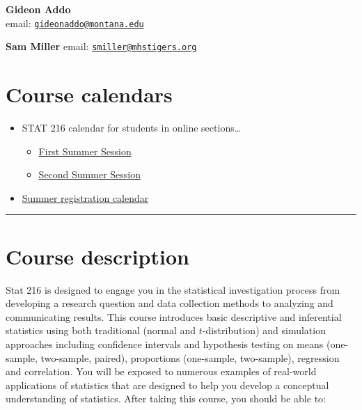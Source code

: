 \documentclass[
]{article}
\providecommand{\tightlist}{%
  \setlength{\itemsep}{0pt}\setlength{\parskip}{0pt}}
\begin{document}
\textbf{Gideon Addo}\\
email:
\href{mailto:gideonaddo@montana.edu}{\nolinkurl{gideonaddo@montana.edu}}

\textbf{Sam Miller} email:
\href{mailto:smiller@mhstigers.org}{\nolinkurl{smiller@mhstigers.org}}

\section{Course calendars}\label{course-calendars}

\begin{itemize}
\tightlist
\item
  STAT 216 calendar for students in online sections\ldots{}

  \begin{itemize}
  \tightlist
  \item
    \href{calendars/Sum1_25-Stat216_Calendar-Online.pdf}{First Summer
    Session}
  \item
    \href{calendars/Sum2_25-Stat216_Calendar-Online.pdf}{Second Summer
    Session}
  \end{itemize}
\item
  \href{https://www.montana.edu/registrar/add_drop_schedule.html}{Summer
  registration calendar}
\end{itemize}

\begin{center}\rule{0.5\linewidth}{0.5pt}\end{center}

\section{Course description}\label{course-description}

Stat 216 is designed to engage you in the statistical investigation
process from developing a research question and data collection methods
to analyzing and communicating results. This course introduces basic
descriptive and inferential statistics using both traditional (normal
and \(t\)-distribution) and simulation approaches including confidence
intervals and hypothesis testing on means (one-sample, two-sample,
paired), proportions (one-sample, two-sample), regression and
correlation. You will be exposed to numerous examples of real-world
applications of statistics that are designed to help you develop a
conceptual understanding of statistics. After taking this course, you
should be able to:
\end{document}
